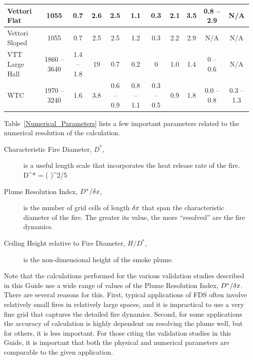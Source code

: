 \begin{landscape}
\begin{longtable}{|l|c|c|c|c|c|c|c|c|c|c|}
Vettori Flat        & 1055          & 0.7           & 2.6   & 2.5               & 1.1                 & 0.3           & 2.1         & 3.5         & 0.8 -- 2.9            & N/A                   \\ \hline
Vettori Sloped      & 1055          & 0.7           & 2.5   & 2.5               & 1.2                 & 0.3           & 2.2         & 2.9         & N/A                   & N/A                   \\ \hline
VTT Large Hall      & 1860 -- 3640  & 1.4 -- 1.8    & 19    & 0.7               & 0.2                 & 0             & 1.0         & 1.4         & 0 -- 0.6              & N/A                   \\ \hline
WTC                 & 1970 -- 3240  & 1.6           & 3.8   & 0.6 -- 0.9        & 0.8 -- 1.1          & 0.3 -- 0.5    & 0.9         & 1.8         & 0.0 -- 0.8            & 0.3 -- 1.3            \\ \hline
\end{longtable}
\end{landscape}


\FloatBarrier

Table~\ref{Numerical_Parameters} lists a few important parameters related to the numerical resolution of the calculation.
\begin{description}
\item[Characteristic Fire Diameter, $D^*$,] is a useful length scale that incorporates the heat release rate of the fire.
\be D^* = \left(  \right)^{2/5}  \ee
\item[Plume Resolution Index, $D^*/\delta x$,] is the number of grid cells of length $\delta x$ that span the characteristic diameter of the fire. The greater its value, the more ``resolved'' are the fire dynamics.
\item[Ceiling Height relative to Fire Diameter, $H/D^*$,] is the non-dimensional height of the smoke plume.
\end{description}
Note that the calculations performed for the various validation studies described in this Guide use a wide range of values of the Plume Resolution Index, $D^*/\delta x$. There are several reasons for this. First, typical applications of FDS often involve relatively small fires in relatively large spaces, and it is impractical to use a very fine grid that captures the detailed fire dynamics. Second, for some applications the accuracy of calculation is highly dependent on resolving the plume well, but for others, it is less important. For those citing the validation studies in this Guide, it is important that both the physical and numerical parameters are comparable to the given application.

